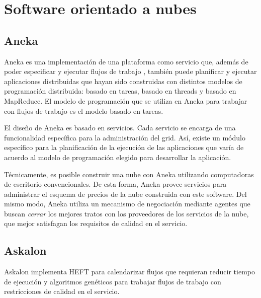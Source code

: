 \section{Software orientado a nubes}

\subsection{Aneka}

Aneka \cite{chu2007aneka} es una implementación de una plataforma como servicio que, además de poder especificar y ejecutar flujos de trabajo , también puede planificar y ejecutar aplicaciones distribuidas que hayan sido construidas con distintos modelos de programación distribuida: basado en tareas, basado en threads y basado en MapReduce. El modelo de programación que se utiliza en Aneka para trabajar con flujos de trabajo es el modelo basado en tareas.

El diseño de Aneka es basado en servicios. Cada servicio se encarga de una funcionalidad específica para la administración del grid. Así, existe un módulo específico para la planificación de la ejecución de las aplicaciones que varía de acuerdo al modelo de programación elegido para desarrollar la aplicación.

Técnicamente, es posible construir una nube con Aneka \cite{vecchiola2009aneka} utilizando computadoras de escritorio convencionales. De esta forma, Aneka provee servicios para administrar el esquema de precios de la nube construida con este software. Del mismo modo, Aneka utiliza un mecanismo de negociación mediante agentes que buscan \emph{cerrar} los mejores tratos con los proveedores de los servicios de la nube, que mejor satisfagan los requisitos de calidad en el servicio.


\subsection{Askalon}

Askalon implementa HEFT para calendarizar flujos que requieran reducir tiempo de ejecución y algoritmos genéticos para trabajar flujos de trabajo con restricciones de calidad en el servicio.
